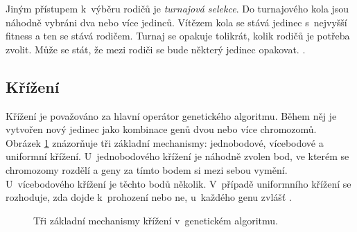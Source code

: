 Jiným přístupem k~výběru rodičů je \emph{turnajová selekce}. Do turnajového kola jsou náhodně vybráni dva nebo více jedinců. Vítězem kola se stává jedinec s~nejvyšší fitness a ten se stává rodičem. Turnaj se opakuje tolikrát, kolik rodičů je potřeba zvolit. Může se stát, že mezi rodiči se bude některý jedinec opakovat. \cite{Modra}.


\subsection{Křížení}

Křížení je považováno za hlavní operátor genetického algoritmu. Během něj je vytvořen nový jedinec jako kombinace genů dvou nebo více chromozomů. Obrázek \ref{obrKrizeni} znázorňuje tři základní mechanismy: jednobodové, vícebodové a uniformní křížení. U~jednobodového křížení je náhodně zvolen bod, ve kterém se chromozomy rozdělí a geny za tímto bodem si mezi sebou vymění. U~vícebodového křížení je těchto bodů několik. V~případě uniformního křížení se rozhoduje, zda dojde k~prohození nebo ne, u~každého genu zvlášť \cite{Modra}.

\begin{figure}[htb]
    \centering
    \caption{Tři základní mechanismy křížení v~genetickém algoritmu.}
    \label{obrKrizeni}
\end{figure}


